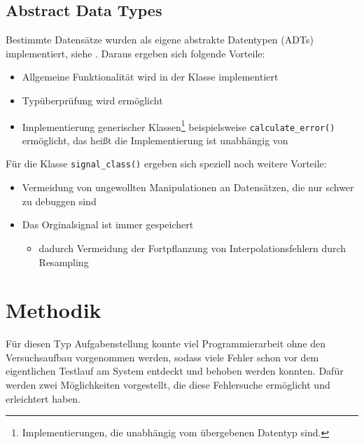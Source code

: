 \documentclass[../Report.tex]{subfiles}
\begin{document}
\subsection*{Abstract Data Types}
\label{subsec:code.adt}
Bestimmte Datensätze wurden als eigene abstrakte Datentypen (ADTs) implementiert, siehe \cite[Kap. 6.1]{mcConnell}. Daraus ergeben sich folgende Vorteile:
\begin{itemize}
	\item Allgemeine Funktionalität wird in der Klasse implementiert
	\item Typüberprüfung wird ermöglicht
	\item Implementierung generischer Klassen\footnote{Implementierungen, die unabhängig vom übergebenen Datentyp sind.} beispielsweise \lstinline{calculate_error()} ermöglicht, das heißt die Implementierung ist unabhängig von
\end{itemize}
Für die Klasse \lstinline{signal_class()} ergeben sich speziell noch weitere Vorteile:
\begin{itemize}
\item Vermeidung von ungewollten Manipulationen an Datensätzen, die nur schwer zu debuggen sind
	\item Das Orginalsignal ist immer gespeichert 
	\begin{itemize}
		\item dadurch Vermeidung der Fortpflanzung von Interpolationsfehlern durch Resampling
	\end{itemize}
\end{itemize}

\section{Methodik}
\label{subsec:code.methodik}
Für diesen Typ Aufgabenstellung konnte viel Programmierarbeit ohne den Versuchsaufbau vorgenommen werden, sodass viele Fehler schon vor dem eigentlichen Testlauf am System entdeckt und behoben werden konnten. Dafür werden zwei Möglichkeiten vorgestellt, die diese Fehlersuche ermöglicht und erleichtert haben.
\end{document}

